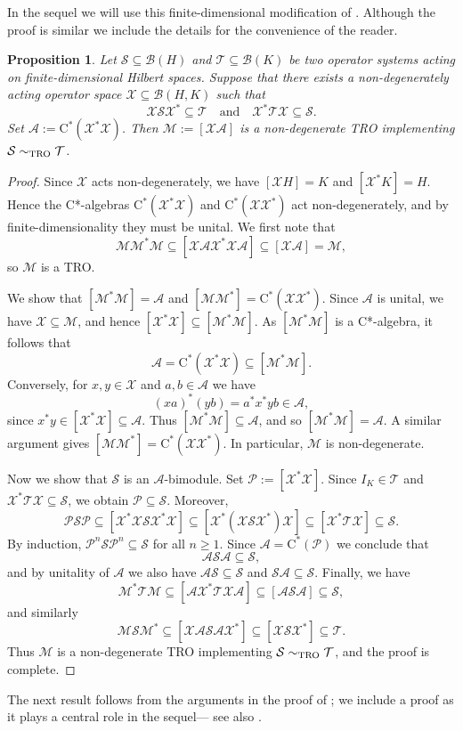 \documentclass[11pt]{amsart}
\numberwithin{equation}{section}
\theoremstyle{plain}
\newtheorem{proposition}[theorem]{Proposition}
\theoremstyle{definition}
\theoremstyle{remark}
\newcommand{\A}{{\mathcal{A}}}
\newcommand{\B}{{\mathcal{B}}}
\newcommand{\M}{{\mathcal{M}}}
\renewcommand{\P}{{\mathcal{P}}}
\renewcommand{\S}{{\mathcal{S}}}
\newcommand{\T}{{\mathcal{T}}}
\newcommand{\X}{{\mathcal{X}}}
\newcommand{\qand}{\quad\text{and}\quad}
\newcommand{\ca}{\mathrm{C}^*}
\begin{document}
In the sequel we will use this finite-dimensional modification of \cite[Proposition 3.4]{EKT21}. Although the proof is similar we include the details for the convenience of the reader. 
\begin{proposition} \label{prop:nondeg_TRO}
Let $\S \subseteq \B(H)$ and $\T \subseteq \B(K)$ be two operator systems acting on finite-dimensional Hilbert spaces. Suppose that  there exists a non-degenerately acting operator space $\X \subseteq \B(H,K)$ such that 
\[ 
\X \S \X^* \subseteq \T \qand \X^*\T \X \subseteq \S.
\]
Set $\A:= \ca(\X^*\X)$. Then $ \M:=[\X\A]$ is a non-degenerate TRO implementing $\S \sim_{\rm TRO} \T$.
\end{proposition}
\begin{proof}
Since $\X$ acts non-degenerately, we have $[\X H]=K$ and $[\X^* K]=H$.
Hence the C*-algebras $\ca(\X^*\X)$ and $\ca(\X\X^*)$ act non-degenerately,
and by finite-dimensionality they must be unital. We first note that
\[
\M\M^*\M \subseteq [\X\A\X^*\X\A]
\subseteq [\X\A]
=\M,
\]
so $\M$ is a TRO. 

We  show that $[\M^*\M] = \A$ and $[\M\M^*] = \ca(\X\X^*)$. Since $\A$ is unital, we have $\X \subseteq \M$,
and hence $[\X^*\X] \subseteq [\M^*\M]$.
As $[\M^*\M]$ is a C*-algebra, it follows that
\[
\A=\ca(\X^*\X)\subseteq [\M^*\M].
\]
Conversely, for $x,y\in\X$ and $a,b\in\A$ we have
\[
(xa)^*(yb)=a^*x^*yb \in \A,
\]
since $x^*y\in [\X^*\X]\subseteq \A$.
Thus $[\M^*\M]\subseteq \A$, and so $[\M^*\M]=\A$.
A similar argument gives $[\M\M^*]=\ca(\X\X^*)$.
In particular, $\M$ is non-degenerate.

Now we show that $\S$ is an $\A$-bimodule.  Set $\P:=[\X^*\X]$.
Since $I_K\in \T$ and $\X^*\T\X\subseteq \S$, we obtain
$\P\subseteq \S$.
Moreover,
\[
\P \S \P \subseteq [\X^*\X \S \X^*\X]
\subseteq [\X^*(\X\S\X^*)\X]
\subseteq [\X^*\T\X]
\subseteq \S.
\]
By induction, $\P^n\S \P^n\subseteq \S$ 
for all $n \geq 1$.
Since $\A=\ca(\P)$ we conclude that
\[
\A\S \A\subseteq \S,
\]
and by unitality of $\A$ we also have $\A \S\subseteq \S$ and $\S\A\subseteq \S$.
Finally, we have
\[
\M^*\T\M
\subseteq [\A\X^*\T\X\A]
\subseteq [\A\S\A]
\subseteq \S,
\]
and similarly
\[
\M\S\M^*
\subseteq [\X\A\S\A\X^*]
\subseteq [\X\S\X^*]
\subseteq \T.
\]
Thus $\M$ is a non-degenerate TRO implementing
$\S \sim_{\rm TRO} \T$, and the proof is complete.
\end{proof}

The next result follows from the arguments in the proof of \cite[Proposition 3.9]{EKT21}; we include a proof as it plays a central role in the sequel--- see also \cite[Theorem 5.10]{EK17}.
\end{document}
